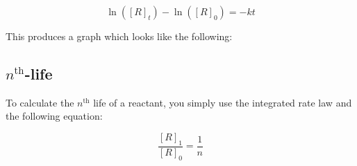 \begin{equation}
  \ln([R]_t) - \ln([R]_0) = -kt
\end{equation}

This produces a graph which looks like the following:


\subsection{$n^{\text{th}}$-life}
To calculate the $n^{\text{th}}$ life of a reactant, you simply use the
integrated rate law and the following equation:

\begin{equation}
  \frac{[R]_1}{[R]_0} = \frac{1}{n}
\end{equation}
